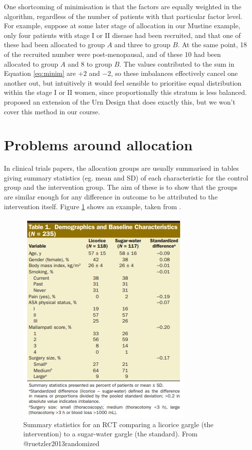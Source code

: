 \documentclass[
  openany]{book}
\theoremstyle{definition}
\theoremstyle{definition}
\theoremstyle{definition}
\theoremstyle{definition}
\theoremstyle{remark}
\begin{document}
One shortcoming of minimisation is that the factors are equally weighted in the algorithm, regardless of the number of patients with that particular factor level. For example, suppose at some later stage of allocation in our Mustine example, only four patients with stage I or II disease had been recruited, and that one of these had been allocated to group \(A\) and three to group \(B\). At the same point, 18 of the recruited number were post-menopausal, and of these 10 had been allocated to group \(A\) and 8 to group \(B\). The values contributed to the sum in Equation \eqref{eq:minim} are \(+2\) and \(-2\), so these imbalances effectively cancel one another out, but intuitively it would feel sensible to prioritise equal distribution within the stage I or II women, since proportionally this stratum is less balanced. \citet{wei1978application} proposed an extension of the Urn Design that does exactly this, but we won't cover this method in our course.

\section{Problems around allocation}\label{problems-around-allocation}

In clinical trials papers, the allocation groups are usually summarised in tables giving summary statistics (eg. mean and SD) of each characteristic for the control group and the intervention group. The aim of these is to show that the groups are similar enough for any difference in outcome to be attributed to the intervention itself. Figure \ref{fig:licorice-participants} shows an example, taken from \citet{ruetzler2013randomized}.

\begin{figure}
\includegraphics[width=0.6\linewidth]{images/licorice} \caption{Summary statistics for an RCT comparing a licorice gargle (the intervention) to a sugar-water gargle (the standard). From @ruetzler2013randomized}\label{fig:licorice-participants}
\end{figure}
\end{document}
